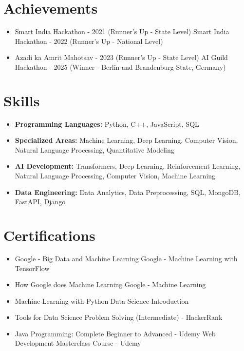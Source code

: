 \documentclass[a4paper,10pt]{article}
\begin{document}
\section*{Achievements}
\begin{itemize}
\item Smart India Hackathon - 2021 (Runner's Up - State Level) \hfill Smart India Hackathon - 2022 (Runner's Up - National Level)
\item Azadi ka Amrit Mahotsav - 2023 (Runner's Up - State Level) \hfill AI Guild Hackathon - 2025 (Winner - Berlin and Brandenburg State, Germany)
\end{itemize}

\section*{Skills}
\begin{itemize}
  \item \textbf{Programming Languages:} Python, C++, JavaScript, SQL
  \item \textbf{Specialized Areas:} Machine Learning, Deep Learning, Computer Vision, Natural Language Processing, Quantitative Modeling
  \item \textbf{AI Development:} Transformers, Deep Learning, Reinforcement Learning, Natural Language Processing, Computer Vision, Machine Learning
  \item \textbf{Data Engineering:} Data Analytics, Data Preprocessing, SQL, MongoDB, FastAPI, Django
\end{itemize}

\section*{Certifications}
\begin{itemize}
\item Google - Big Data and Machine Learning \hfill Google - Machine Learning with TensorFlow
\item How Google does Machine Learning \hfill Google - Machine Learning
\item Machine Learning with Python \hfill Data Science Introduction
\item Tools for Data Science \hfill Problem Solving (Intermediate) - HackerRank
\item Java Programming: Complete Beginner to Advanced - Udemy \hfill Web Development Masterclass Course - Udemy
\end{itemize}
\end{document}
